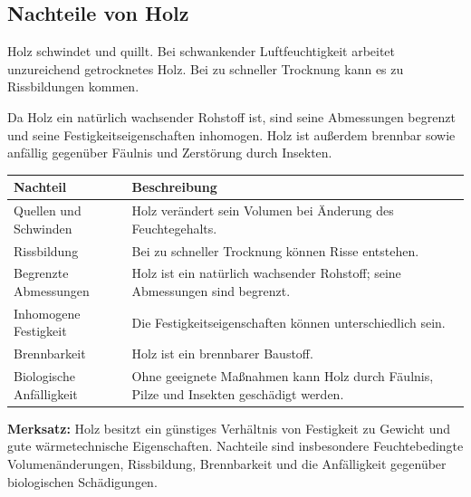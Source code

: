 \documentclass[
  12pt,
  a4paper,
  oneside
]{scrreprt}
\begin{document}
\subsection{Nachteile von Holz}

Holz schwindet und quillt. Bei schwankender Luftfeuchtigkeit arbeitet
unzureichend getrocknetes Holz. Bei zu schneller Trocknung kann es zu
Rissbildungen kommen. 

Da Holz ein natürlich wachsender Rohstoff ist, sind seine Abmessungen
begrenzt und seine Festigkeitseigenschaften inhomogen. Holz ist
außerdem brennbar sowie anfällig gegenüber Fäulnis und Zerstörung durch
Insekten. 

\begin{longtable}{
  >{\raggedright\arraybackslash}p{}
  >{\raggedright\arraybackslash}p{}
}
\toprule
\textbf{Nachteil} &
\textbf{Beschreibung} \\
\midrule
\endhead

Quellen und Schwinden &
Holz verändert sein Volumen bei Änderung des Feuchtegehalts. \\

Rissbildung &
Bei zu schneller Trocknung können Risse entstehen. \\

Begrenzte Abmessungen &
Holz ist ein natürlich wachsender Rohstoff; seine Abmessungen sind
begrenzt. \\

Inhomogene Festigkeit &
Die Festigkeitseigenschaften können unterschiedlich sein. \\

Brennbarkeit &
Holz ist ein brennbarer Baustoff. \\

Biologische Anfälligkeit &
Ohne geeignete Maßnahmen kann Holz durch Fäulnis, Pilze und Insekten
geschädigt werden. \\

\bottomrule
\end{longtable}



\begin{merksatzbox}
\textbf{Merksatz:}
Holz besitzt ein günstiges Verhältnis von Festigkeit zu Gewicht und
gute wärmetechnische Eigenschaften. Nachteile sind insbesondere
Feuchtebedingte Volumenänderungen, Rissbildung, Brennbarkeit und die
Anfälligkeit gegenüber biologischen Schädigungen.

\end{merksatzbox}
\end{document}
